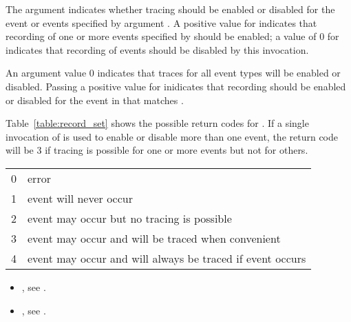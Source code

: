 The argument  indicates whether tracing should be
enabled or disabled for the event or events specified by
argument . A positive value for 
indicates that recording of one or more events specified by
 should be enabled; a value of 0 for  indicates
that recording of events should be disabled by this invocation.

An argument  value 0 indicates that traces for all
event types will be enabled or disabled.  Passing a positive value for
 inidicates that recording should be enabled or disabled
for the event in  that matches .


\effect

Table~\ref{table:record_set} shows the possible return
codes for .  If a single invocation
of  is used to enable or disable
more than one event, the return code will
be 3 if tracing is possible for one or more events but not for
others.

\nolinenumbers
\renewcommand{\arraystretch}{1.5}
\tablelasttail{\hline}
\begin{supertabular}{p{2.0in} p{3.0in}}
0 & error\\
1 & event will never occur\\
2 & event may occur but no tracing is possible\\
3 & event may occur and will be traced when convenient\\
4 & event may occur and will always be traced if event occurs\\
\end{supertabular}

\linenumbers

\crossreferences
\begin{itemize}
\item {},
see .
\item {},
see .
\end{itemize}

